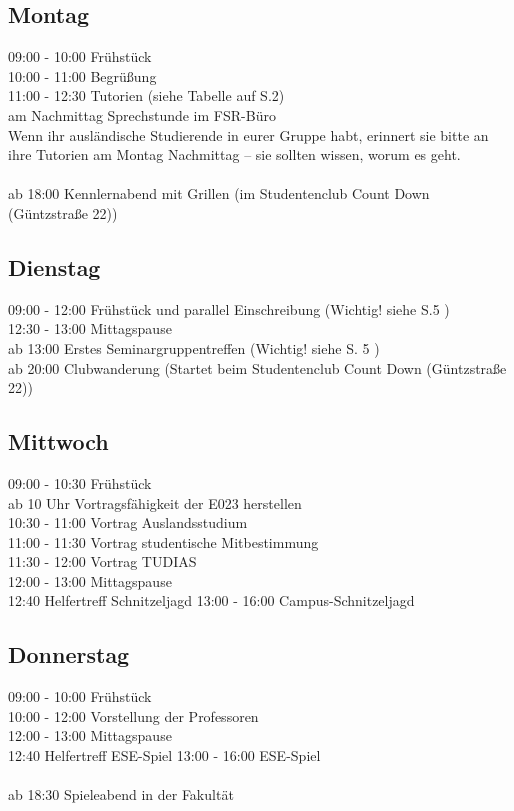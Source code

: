 \documentclass[a4paper,12pt]{report}
\begin{document}
\subsection{Montag}
09:00 - 10:00 Frühstück\\
10:00 - 11:00 Begrüßung\\
11:00 - 12:30 Tutorien (siehe Tabelle auf S.2)\\
am Nachmittag Sprechstunde im FSR-Büro\\
Wenn ihr ausländische Studierende in eurer Gruppe habt, erinnert sie bitte an ihre Tutorien am Montag Nachmittag – sie sollten wissen, worum es geht.\\
\\
ab 18:00 Kennlernabend mit Grillen (im Studentenclub Count Down (Güntzstraße 22))\\

\subsection{Dienstag}
09:00 - 12:00 Frühstück und parallel Einschreibung (Wichtig! siehe S.5 )\\
12:30 - 13:00 Mittagspause \\
ab 13:00  Erstes Seminargruppentreffen (Wichtig! siehe S. 5 )
\\
ab 20:00 Clubwanderung (Startet beim Studentenclub Count Down (Güntzstraße 22))\\

\subsection{Mittwoch}
09:00 - 10:30 Frühstück\\
ab 10 Uhr Vortragsfähigkeit der E023 herstellen\\
10:30 - 11:00 Vortrag Auslandsstudium\\
11:00 - 11:30 Vortrag studentische Mitbestimmung \\
11:30 - 12:00 Vortrag TUDIAS \\
12:00 - 13:00 Mittagspause \\
12:40 Helfertreff Schnitzeljagd
13:00 - 16:00 Campus-Schnitzeljagd \\


\subsection{Donnerstag}
09:00 - 10:00 Frühstück\\
10:00 - 12:00 Vorstellung der Professoren\\
12:00 - 13:00 Mittagspause\\
12:40 Helfertreff ESE-Spiel
13:00 - 16:00 ESE-Spiel\\
\\
ab 18:30 Spieleabend in der Fakultät\\
\end{document}
